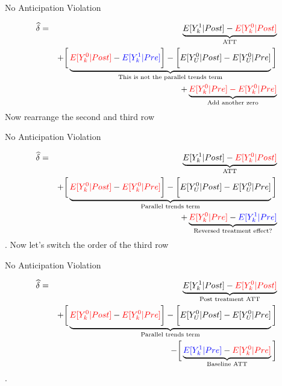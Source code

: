 \documentclass{beamer}
\begin{document}
\begin{frame}{No Anticipation Violation}

\begin{eqnarray*}
\widehat{\delta} &=& \underbrace{E[Y^1_k | Post] - \textcolor{red}{E[Y^0_k | Post]}}_{\mathclap{\text{ATT}}} \\
&& + \bigg [  \underbrace{\textcolor{red}{E[Y^0_k | Post]} - \textcolor{blue}{E[Y^1_k | Pre]} \bigg ] - \bigg [ \textcolor{black}{E[Y^0_U | Post]} - E[Y_U^0 | Pre] }_{\mathclap{\text{This is not the parallel trends term}}} \bigg ] \\
&& + \underbrace{ \textcolor{red}{E[Y^0_k|Pre] - E[Y^0_k|Pre]}}_{\mathclap{\text{Add another zero}}}
\end{eqnarray*} Now rearrange the second and third row

\end{frame}

\begin{frame}{No Anticipation Violation}

\begin{eqnarray*}
\widehat{\delta} &=& \underbrace{E[Y^1_k | Post] - \textcolor{red}{E[Y^0_k | Post]}}_{\mathclap{\text{ATT}}} \\
&& + \bigg [  \underbrace{\textcolor{red}{E[Y^0_k | Post]} - \textcolor{red}{E[Y^0_k | Pre]} \bigg ] - \bigg [ \textcolor{black}{E[Y^0_U | Post]} - E[Y_U^0 | Pre] }_{\mathclap{\text{Parallel trends term}}} \bigg ] \\
&& + \underbrace{ \textcolor{red}{E[Y^0_k|Pre]} - \textcolor{blue}{E[Y^1_k|Pre]}}_{\mathclap{\text{Reversed treatment effect?}}}
\end{eqnarray*}. Now let's switch the order of the third row

\end{frame}

\begin{frame}{No Anticipation Violation}

\begin{eqnarray*}
\widehat{\delta} &=& \underbrace{E[Y^1_k | Post] - \textcolor{red}{E[Y^0_k | Post]}}_{\mathclap{\text{Post treatment ATT}}} \\
&& + \bigg [  \underbrace{\textcolor{red}{E[Y^0_k | Post]} - \textcolor{red}{E[Y^0_k | Pre]} \bigg ] - \bigg [ \textcolor{black}{E[Y^0_U | Post]} - E[Y_U^0 | Pre] }_{\mathclap{\text{Parallel trends term}}} \bigg ] \\
&& - \bigg [ \underbrace{ \textcolor{blue}{E[Y^1_k|Pre]} - \textcolor{red}{E[Y^0_k|Pre]}}_{\mathclap{\text{Baseline ATT}}} \bigg ]
\end{eqnarray*}. 

\end{frame}
\end{document}
